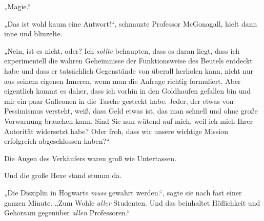 „Magie.“

„Das ist wohl kaum eine Antwort!“, schnauzte Professor McGonagall, hielt dann inne und blinzelte.

„Nein, ist es nicht, oder? Ich \emph{sollte} behaupten, dass es daran liegt, dass ich experimentell die wahren Geheimnisse der Funktionsweise des Beutels entdeckt habe und dass er tatsächlich Gegenstände von überall herholen kann, nicht nur aus seinem eigenen Inneren, wenn man die Anfrage richtig formuliert. Aber eigentlich kommt es daher, dass ich vorhin in den Goldhaufen gefallen bin und mir ein paar Galleonen in die Tasche gesteckt habe. Jeder, der etwas von Pessimismus versteht, weiß, dass Geld etwas ist, das man schnell und ohne große Vorwarnung brauchen kann. Sind Sie nun wütend auf mich, weil ich mich Ihrer Autorität widersetzt habe? Oder froh, dass wir unsere wichtige Mission erfolgreich abgeschlossen haben?“

Die Augen des Verkäufers waren groß wie Untertassen.

Und die große Hexe stand stumm da.

„Die Disziplin in Hogwarts \emph{muss} gewahrt werden.“, sagte sie nach fast einer ganzen Minute.
„Zum Wohle \emph{aller} Studenten. Und das beinhaltet Höflichkeit und Gehorsam gegenüber \emph{allen} Professoren.“

